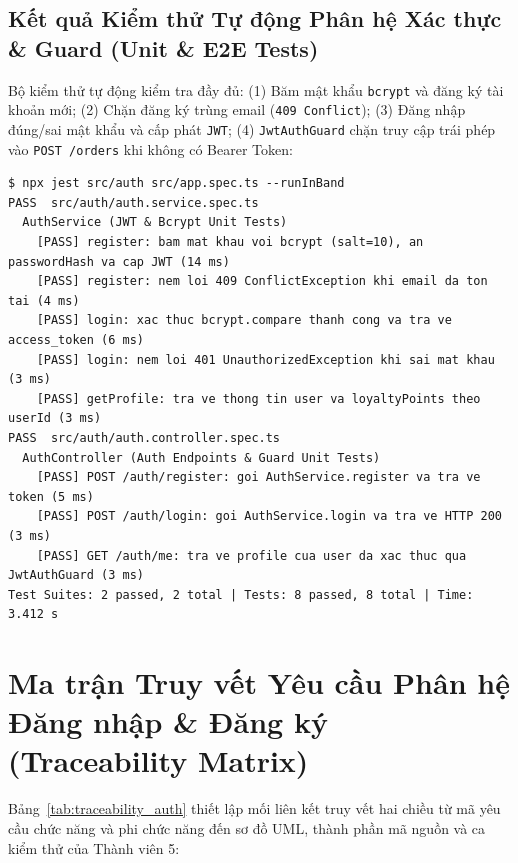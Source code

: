\documentclass[a4paper]{article}
\begin{document}
\subsection{Kết quả Kiểm thử Tự động Phân hệ Xác thực \& Guard (Unit \& E2E Tests)}
Bộ kiểm thử tự động kiểm tra đầy đủ: (1) Băm mật khẩu \texttt{bcrypt} và đăng ký tài khoản mới; (2) Chặn đăng ký trùng email (\texttt{409 Conflict}); (3) Đăng nhập đúng/sai mật khẩu và cấp phát \texttt{JWT}; (4) \texttt{JwtAuthGuard} chặn truy cập trái phép vào \texttt{POST /orders} khi không có Bearer Token:

\begin{lstlisting}[caption={Kết quả chạy bộ kiểm thử tự động phân hệ Auth JWT \& Guard (Passed 100\%)}]
$ npx jest src/auth src/app.spec.ts --runInBand
PASS  src/auth/auth.service.spec.ts
  AuthService (JWT & Bcrypt Unit Tests)
    [PASS] register: bam mat khau voi bcrypt (salt=10), an passwordHash va cap JWT (14 ms)
    [PASS] register: nem loi 409 ConflictException khi email da ton tai (4 ms)
    [PASS] login: xac thuc bcrypt.compare thanh cong va tra ve access_token (6 ms)
    [PASS] login: nem loi 401 UnauthorizedException khi sai mat khau (3 ms)
    [PASS] getProfile: tra ve thong tin user va loyaltyPoints theo userId (3 ms)
PASS  src/auth/auth.controller.spec.ts
  AuthController (Auth Endpoints & Guard Unit Tests)
    [PASS] POST /auth/register: goi AuthService.register va tra ve token (5 ms)
    [PASS] POST /auth/login: goi AuthService.login va tra ve HTTP 200 (3 ms)
    [PASS] GET /auth/me: tra ve profile cua user da xac thuc qua JwtAuthGuard (3 ms)
Test Suites: 2 passed, 2 total | Tests: 8 passed, 8 total | Time: 3.412 s
\end{lstlisting}

\section{Ma trận Truy vết Yêu cầu Phân hệ Đăng nhập \& Đăng ký (Traceability Matrix)}

Bảng~\ref{tab:traceability_auth} thiết lập mối liên kết truy vết hai chiều từ mã yêu cầu chức năng và phi chức năng đến sơ đồ UML, thành phần mã nguồn và ca kiểm thử của Thành viên 5:
\end{document}
